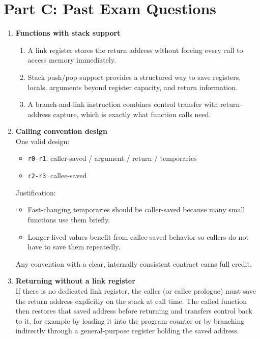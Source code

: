 \documentclass[11pt]{article}
\begin{document}
\section*{Part C: Past Exam Questions}
\begin{enumerate}[label=\textbf{C\arabic*.}]
  \item \textbf{Functions with stack support}
  \begin{enumerate}[label=(\alph*)]
    \item A link register stores the return address without forcing every call to access memory immediately.
    \item Stack push/pop support provides a structured way to save registers, locals, arguments beyond register capacity, and return information.
    \item A branch-and-link instruction combines control transfer with return-address capture, which is exactly what function calls need.
  \end{enumerate}

  \item \textbf{Calling convention design}
  \\[0.5ex]
  One valid design:
  \begin{itemize}[leftmargin=1.5em]
    \item \texttt{r0-r1}: caller-saved / argument / return / temporaries
    \item \texttt{r2-r3}: callee-saved
  \end{itemize}
  Justification:
  \begin{itemize}[leftmargin=1.5em]
    \item Fast-changing temporaries should be caller-saved because many small functions use them briefly.
    \item Longer-lived values benefit from callee-saved behavior so callers do not have to save them repeatedly.
  \end{itemize}
  Any convention with a clear, internally consistent contract earns full credit.

  \item \textbf{Returning without a link register}
  \\[0.5ex]
  If there is no dedicated link register, the caller (or callee prologue) must save the return address explicitly on the stack at call time. The called function then restores that saved address before returning and transfers control back to it, for example by loading it into the program counter or by branching indirectly through a general-purpose register holding the saved address.
\end{enumerate}
\end{document}
